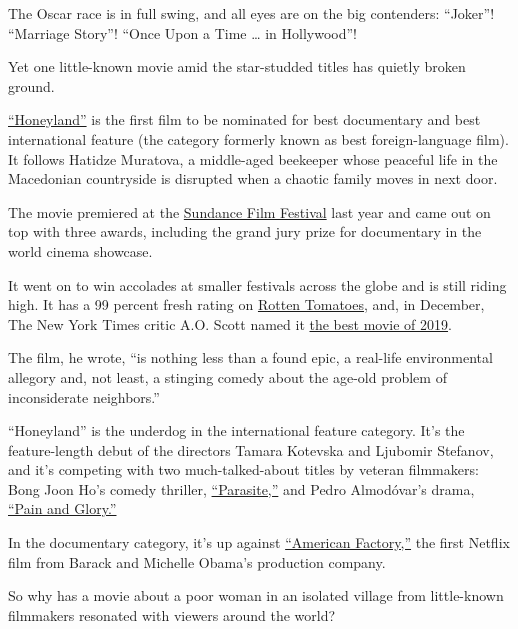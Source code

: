 The Oscar race is in full swing, and all eyes are on the big contenders:
``Joker''! ``Marriage Story''! ``Once Upon a Time \ldots{} in
Hollywood''!

Yet one little-known movie amid the star-studded titles has quietly
broken ground.

\href{https://www.nytimes.com/2019/07/25/movies/honeyland-review.html}{``Honeyland''}
is the first film to be nominated for best documentary and best
international feature (the category formerly known as best
foreign-language film). It follows Hatidze Muratova, a middle-aged
beekeeper whose peaceful life in the Macedonian countryside is disrupted
when a chaotic family moves in next door.

The movie premiered at the
\href{https://www.sundance.org/blogs/news/2019-sundance-film-festival-awards-announced}{Sundance
Film Festival} last year and came out on top with three awards,
including the grand jury prize for documentary in the world cinema
showcase.

It went on to win accolades at smaller festivals across the globe and is
still riding high. It has a 99 percent fresh rating on
\href{https://www.rottentomatoes.com/m/honeyland}{Rotten Tomatoes}, and,
in December, The New York Times critic A.O. Scott named it
\href{https://www.nytimes.com/2019/12/04/movies/best-films.html}{the
best movie of 2019}.

The film, he wrote, ``is nothing less than a found epic, a real-life
environmental allegory and, not least, a stinging comedy about the
age-old problem of inconsiderate neighbors.''

``Honeyland'' is the underdog in the international feature category.
It's the feature-length debut of the directors Tamara Kotevska and
Ljubomir Stefanov, and it's competing with two much-talked-about titles
by veteran filmmakers: Bong Joon Ho's comedy thriller,
\href{https://www.nytimes.com/2019/10/10/movies/parasite-review.html}{``Parasite,''}
and Pedro Almodóvar's drama,
\href{https://www.nytimes.com/2019/10/03/movies/pain-and-glory-review.html}{``Pain
and Glory.''}

In the documentary category, it's up against
\href{https://www.nytimes.com/2019/08/20/movies/american-factory-review.html}{``American
Factory,''} the first Netflix film from Barack and Michelle Obama's
production company.

So why has a movie about a poor woman in an isolated village from
little-known filmmakers resonated with viewers around the world?

